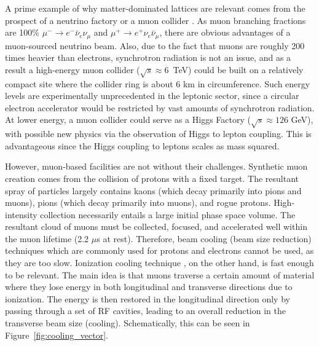 \documentclass{jacow}
\begin{document}
A prime example of why matter-dominated lattices are relevant comes from the prospect of a neutrino factory or a muon collider \cite{map}. As muon branching fractions are 100\% $\mu^-\rightarrow e^- \bar{\nu}_e \nu_\mu$ and $\mu^+\rightarrow e^+ \nu_e \bar{\nu}_\mu$, there are obvious advantages of a muon-sourced neutrino beam. Also, due to the fact that muons are roughly 200 times heavier than electrons, synchrotron radiation is not an issue, and as a result a high-energy muon collider ($\sqrt{s}\approx 6$~TeV) could be built on a relatively compact site where the collider ring is about 6 km in circumference. Such energy levels are experimentally unprecedented in the leptonic sector, since a circular electron accelerator would be restricted by vast amounts of synchrotron radiation. At lower energy, a muon collider could serve as a Higgs Factory ($\sqrt{s} \approx 126$ GeV), with possible new physics via the observation of Higgs to lepton coupling. This is advantageous since the Higgs coupling to leptons scales as mass squared. 


However, muon-based facilities are not without their challenges. Synthetic muon creation comes from the collision of protons with a fixed target. The resultant spray of particles largely contains kaons (which decay primarily into pions and muons), pions (which decay primarily into muons), and rogue protons. High-intensity collection necessarily entails a large initial phase space volume. The resultant cloud of muons must be collected, focused, and accelerated well within the muon lifetime (2.2 $\mu$s at rest). Therefore, beam cooling (beam size reduction) techniques which are commonly used for protons and electrons cannot be used, as they are too slow. Ionization cooling technique \cite{Parkhomchuk}, on the other hand, is fast enough to be relevant. The main idea is that muons traverse a certain amount of material where they lose energy in both longitudinal and transverse directions due to ionization. The energy is then restored in the longitudinal direction only by passing through a set of RF cavities, leading to an overall reduction in the transverse beam size (cooling). Schematically, this can be seen in Figure~\ref{fig:cooling_vector}.
\end{document}
